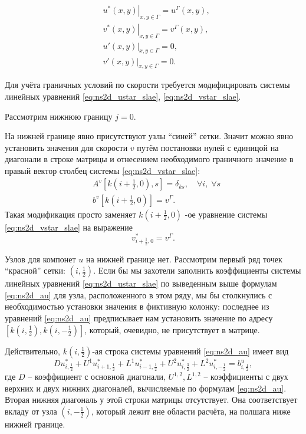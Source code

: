 \begin{align}
    \label{eq:ns2d_usplit_bc}
    &\left. u^*(x, y) \right|_{x,y\in\Gamma} = u^\Gamma(x, y), \\
    \nonumber
    &\left. v^*(x, y) \right|_{x,y\in\Gamma} = v^\Gamma(x, y), \\
    \nonumber
    &\left. u'(x, y) \right|_{x,y\in\Gamma} = 0,\\
    \nonumber
    &\left. v'(x, y) \right|_{x,y\in\Gamma} = 0.
\end{align}

Для учёта граничных условий по скорости требуется модифицировать
системы линейных уравнений \eqref{eq:ns2d_ustar_slae}, \eqref{eq:ns2d_vstar_slae}.

Рассмотрим нижнюю границу $j=0$.

На нижней границе явно присутствуют узлы ``синей'' сетки.
Значит можно явно установить значения для скорости $v$
путём постановки нулей с единицой на диагонали в строке матрицы и отнесением необходимого
граничного значение в правый вектор столбец системы \eqref{eq:ns2d_vstar_slae}:
\begin{align}
    \label{eq:ns2d_bc1}
    &A^v[k(i+\tfrac12, 0), s] = \delta_{ks}, \quad \forall i, \; \forall s\\[10pt]
    \nonumber
    &b^{v}[k(i+\tfrac12, 0)] = v^\Gamma.
\end{align}
Такая модификация просто заменяет $k(i+\tfrac12, 0)$ -ое уравнение
системы \eqref{eq:ns2d_vstar_slae} на выражение
\begin{equation*}
    v^*_{i+\tfrac12, 0} = v^\Gamma.
\end{equation*}

Узлов для компонет $u$ на нижней границе нет.
Рассмотрим первый ряд точек ``красной'' сетки: $(i, \tfrac12)$.
Если бы мы захотели заполнить коэффициенты системы
линейных уравнений \eqref{eq:ns2d_ustar_slae}
по выведенным выше формулам \eqref{eq:ns2d_au}
для узла, расположенного в этом ряду, мы бы столкнулись
с необходимостью установки значения в фиктивную колонку:
последнее из уравнений \eqref{eq:ns2d_au}
предписывает нам установить значение по адресу
$[k(i, \tfrac12), k(i, -\tfrac12)]$, который, очевидно, не присутствует в матрице.

Действительно, $k(i,\tfrac12)$-ая строка системы уравнений \eqref{eq:ns2d_au}
имеет вид
\begin{equation}
    \label{eq:ns2d_au_low}
      D    u^*_{i, \tfrac12}
    + U^1  u^*_{i+1, \tfrac12}
    + L^1  u^*_{i-1, \tfrac12}
    + U^2 u^*_{i, \tfrac32}
    + L^2 u^*_{i, -\tfrac12} 
    = b^u_{i, \tfrac12},
\end{equation}
где $D$ -- коэффициент с основной диагонали, $U^{1,2}, L^{1,2}$ -- 
коэффициенты с двух верхних и двух нижних диагоналей, вычисляемые по формулам \eqref{eq:ns2d_au}.
Вторая нижняя диагональ у этой строки матрицы отсутствует.
Она соответствует вкладу от узла $(i, -\tfrac12)$, который лежит вне области расчёта, на полшага ниже
нижней границе.

